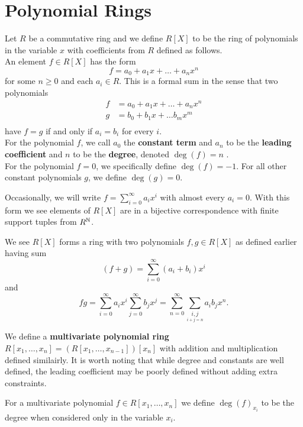 \section{Polynomial Rings}
\begin{definition}
	Let \(R\) be a commutative ring and we define \(R\left[ X \right] \) to be the ring of polynomials in the variable \(x\) with coefficients from \(R\) defined as follows.\\
	An element \(f \in R\left[ X \right] \) has the form \[
	f = a_0 + a_1x + \ldots + a_{n} x^{n}
	\] for some \(n \ge 0\) and each \(a_{i} \in R\). This is a formal sum in the sense that two polynomials
	\begin{align*}
		f&= a_0 + a_1x + \ldots + a_{n}x^{n} \\
		g&= b_0 + b_1 x + \ldots b_{m} x^{m}  \\
	\end{align*} have \(f = g\) if and only if \(a_{i} = b_{i}\) for every \(i\).\\
For the polynomial \(f\), we call \(a_0\) the \textbf{constant term} and \(a_{n}\) to be the \textbf{leading coefficient} and \(n\) to be the \textbf{degree}, denoted \(\deg \left( f \right) = n\) .\\
For the polynomial \(f = 0\), we specifically define \(\deg \left(  f \right) = -1\). For all other constant polynomials \(g\), we define \(\deg \left( g \right) = 0\).
\end{definition}
\begin{remark}
	Occasionally, we will write \(f = \sum_{i=0}^{\infty} a_{i} x^{i}\) with almost every \(a_{i} = 0\). With this form we see elements of \(R\left[ X \right] \) are in a bijective correspondence with finite support tuples from \(R^{\mathbb{N}}\).
\end{remark}
We see \(R\left[ X \right] \) forms a ring with two polynomials \(f, g \in R\left[ X \right] \) as defined earlier having sum \[
	\left( f + g \right)  = \sum_{i=0}^{\infty} \left( a_{i} + b_{i} \right) x^{i}
\] and \[
fg = \sum_{i=0}^{\infty} a_{i} x^{i} \sum_{j=0 }^{\infty} b_{j}x^{j} = \sum_{n=0}^{\infty} \sum_{\underset{i + j = n}{i ,j}}^{}a_{i}b_{j} x^{n}
.\]
\begin{definition}
We define a \textbf{multivariate polynomial ring}	\(R \left[ x_1, \ldots, x_{n} \right] = \left( R\left[ x_1, \ldots, x_{n-1} \right]  \right) \left[ x_{n} \right]  \) with addition and multiplication defined similairly. It is worth noting that while degree and constants are well defined, the leading coefficient may be poorly defined without adding extra constraints.
\end{definition}
\begin{definition}
	For a multivariate polynomial \(f \in R\left[ x_1, \ldots, x_{n} \right] \) we define \(\deg \left(  f \right) _{x_{i}}\) to be the degree when considered only in the variable \(x_{i}\).
\end{definition}
